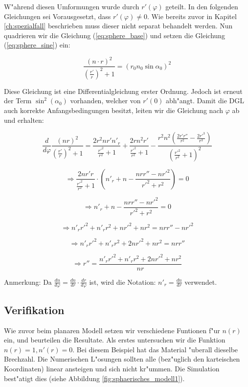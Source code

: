\begin{refsection}
W"ahrend diesen Umformungen wurde durch $r'(\varphi)$ geteilt. 
In den folgenden Gleichungen sei Vorausgesetzt, dass $r'(\varphi) \neq 0$. 
Wie bereits zuvor in Kapitel \ref{ch:spezialfall} beschrieben muss dieser nicht separat behandelt werden.
Nun quadrieren wir die Gleichung (\ref{eq:sphere_base}) und setzen die Gleichung (\ref{eq:sphere_sine}) ein:

$$\frac{(n \cdot r)^2}{\displaystyle\left( \frac{r'}{r} \right)^2 +1} = (r_0 n_0 \sin \alpha_0)^2$$

Diese Gleichung ist eine Differentialgleichung erster Ordnung. 
Jedoch ist erneut der Term $\sin^2(\alpha_0)$ vorhanden, welcher von $r'(0)$ abh"angt. 
Damit die DGL auch korrekte Anfangsbedingungen besitzt, leiten wir die Gleichung nach $\varphi$ ab und erhalten:

$$\frac{d}{d\varphi}\frac{(n r)^2}{\left(\displaystyle\frac{r'}{r}\right)^2 + 1} =  \frac{2 r^2 n r' n'_r}{\displaystyle\frac{r'^2}{r^2}+1}+\frac{2 r n^2 r'}{\displaystyle\frac{r'^2}{r^2}+1}-\frac{r^2 n^2 \left(\displaystyle\frac{2 r' r''}{r^2}-\frac{2 r'^3}{r^3}\right)}{\left(\displaystyle\frac{r'^2}{r^2}+1\right)^2}$$

$$\Rightarrow \frac{2n r' r}{\displaystyle\frac{r'^2}{r^2}+1} \cdot \left( n'_r + n - \frac{n r r'' - n r'^2}{r'^2 + r^2} \right) = 0$$

\begin{equation} \label{eq:sphere_origin}
\Rightarrow n'_r + n - \frac{n r r'' - n r'^2}{r'^2 + r^2} = 0
\end{equation}

$$\Rightarrow n'_r r'^2  + n'_r r^2 + n r'^2 + nr^2 = n r r'' - n r'^2$$

$$\Rightarrow n'_r r'^2 + n'_r r^2 + 2 n r'^2 + n r^2 = n r r''$$

\begin{equation} \label{eq:sphere_allg}
\Rightarrow r'' = \frac{n'_r r'^2 + n'_r r^2 + 2 n r'^2 + n r^2}{n r}
\end{equation}

Anmerkung: Da $\frac{dn}{d\varphi} = \frac{dn}{dr} \cdot \frac{dr}{d\varphi}$ ist, wird die Notation: $n'_r = \frac{dn}{dr}$ verwendet.

\subsection{Verifikation}
Wie zuvor beim planaren Modell setzen wir verschiedene Funtionen f"ur $n(r)$ ein, und beurteilen die Resultate. 
Als erstes untersuchen wir die Funktion $n(r) = 1, n'(r) = 0$. 
Bei diesem Beispiel hat das Material "uberall dieselbe Brechzahl.
Die Numerischen L"osungen sollten alle (bez"uglich den karteischen Koordinaten) linear ansteigen und sich nicht kr"ummen. Die Simulation best"atigt dies (siehe Abbildung \ref{fig:sphaerisches_modell1}).


\end{refsection}
